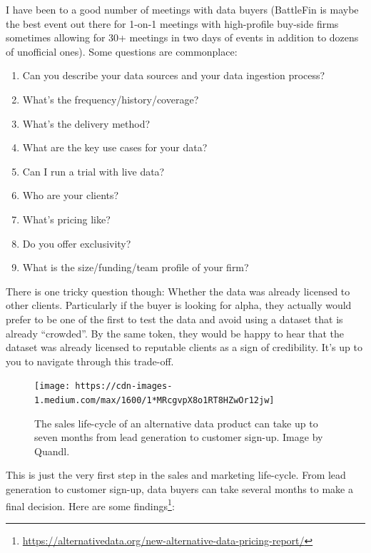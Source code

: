 \documentclass[]{book}
\DeclareRobustCommand{\href}[2]{#2\footnote{\url{#1}}}
\providecommand{\tightlist}{%
  \setlength{\itemsep}{0pt}\setlength{\parskip}{0pt}}
\theoremstyle{definition}
\theoremstyle{definition}
\theoremstyle{definition}
\theoremstyle{remark}
\begin{document}
I have been to a good number of meetings with data buyers (BattleFin is
maybe the best event out there for 1-on-1 meetings with high-profile
buy-side firms sometimes allowing for 30+ meetings in two days of events
in addition to dozens of unofficial ones). Some questions are
commonplace:

\begin{enumerate}
\def\labelenumi{\arabic{enumi}.}
\tightlist
\item
  Can you describe your data sources and your data ingestion process?
\item
  What's the frequency/history/coverage?
\item
  What's the delivery method?
\item
  What are the key use cases for your data?
\item
  Can I run a trial with live data?
\item
  Who are your clients?
\item
  What's pricing like?
\item
  Do you offer exclusivity?
\item
  What is the size/funding/team profile of your firm?
\end{enumerate}

There is one tricky question though: Whether the data was already
licensed to other clients. Particularly if the buyer is looking for
alpha, they actually would prefer to be one of the first to test the
data and avoid using a dataset that is already ``crowded''. By the same
token, they would be happy to hear that the dataset was already licensed
to reputable clients as a sign of credibility. It's up to you to
navigate through this trade-off.

\begin{figure}[h]

{\centering \texttt{[image: https://cdn-images-1.medium.com/max/1600/1*MRcgvpX8o1RT8HZwOr12jw]} 

}

\caption{The sales life-cycle of an alternative data product can take up to seven months from lead generation to customer sign-up. Image by Quandl.}\label{fig:unnamed-chunk-63}
\end{figure}

This is just the very first step in the sales and marketing life-cycle.
From lead generation to customer sign-up, data buyers can take several
months to make a final decision. Here are some
\href{https://alternativedata.org/new-alternative-data-pricing-report/}{findings}:
\end{document}
